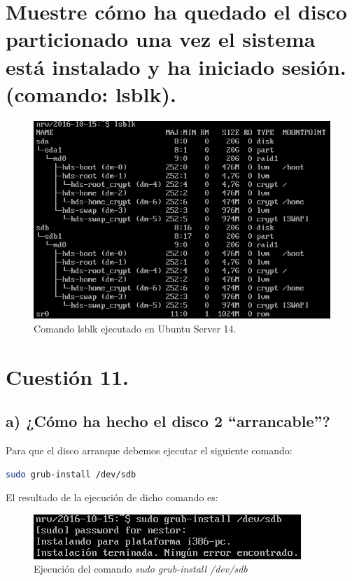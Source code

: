 \documentclass[a4paper,titlepage,12pt]{scrartcl}	%
\numberwithin{figure}{section} %
\numberwithin{table}{section} %
\begin{document}
	\section[Muestre cómo ha quedado el disco particionado una vez el sistema está instalado y ha iniciado sesión. (comando: lsblk).]{Muestre cómo ha quedado el disco particionado una vez el sistema está instalado y ha iniciado sesión. (comando: lsblk).}
	
	\begin{figure}[H]
		\centering
		\includegraphics[scale=0.55]{./Imagenes/lsblk-US.png}
		\caption[Comando lsblk ejecutado en Ubuntu Server 14.]{Comando lsblk ejecutado en Ubuntu Server 14.}
	\end{figure}
		
	\section[Cuestión 11.]{Cuestión 11.}
	
	\subsection[a) ¿Cómo ha hecho el disco 2 “arrancable”?]{a) ¿Cómo ha hecho el disco 2 “arrancable”?}
	
	Para que el disco arranque debemos ejecutar el siguiente comando: \cite{grubinstall}
	\begin{lstlisting}[language=bash]
		sudo grub-install /dev/sdb
	\end{lstlisting}
	
	El resultado de la ejecución de dicho comando es:
	
	\begin{figure}[H]
		\centering
		\includegraphics[scale=0.7]{./Imagenes/grub-install.png}
		\caption[Ejecución del comando \textit{sudo grub-install /dev/sdb}.]{Ejecución del comando \textit{sudo grub-install /dev/sdb}}
	\end{figure}
	
\end{document}
